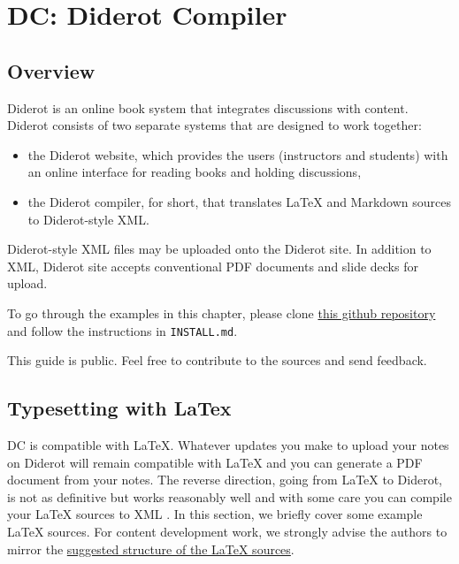\chapter{DC: Diderot Compiler}
\label{ch:dc}
 

\section{Overview}

Diderot is an online book system that integrates discussions with
content.  Diderot consists of two separate systems that are
designed to work together:
%
\begin{itemize}
\item the Diderot website, which
provides the users (instructors and students) with an online interface
for reading books and holding discussions, 
\item the Diderot
compiler,  for short, that translates LaTeX and Markdown
sources to Diderot-style XML.
\end{itemize}
%
Diderot-style XML files may be uploaded onto the Diderot site. 
%
In addition to XML, Diderot site accepts conventional PDF documents
and slide decks for upload. 
%


\begin{important}
To go through the examples in this chapter, please clone 
%
\href{https://github.com/diderot-edu/diderot-guide}{this github repository}
%
and follow the instructions in \lstinline`INSTALL.md`. 

This guide is public.  Feel free to contribute to the sources and send feedback.  
\end{important}


\section{Typesetting with LaTex}

DC is compatible with LaTeX. Whatever updates you make to upload your notes on Diderot will remain compatible with LaTeX and  you can generate a PDF document from your notes.
%
The reverse direction, going from LaTeX to Diderot, is not as
definitive but works reasonably well and with some care you can
compile your LaTeX sources to XML .
%
In this section, we briefly cover some example LaTeX sources.  
%
For content development work, we strongly advise the authors to mirror
the
\href{sec:dc::latex-structure}{suggested structure of the LaTeX sources}.
%


